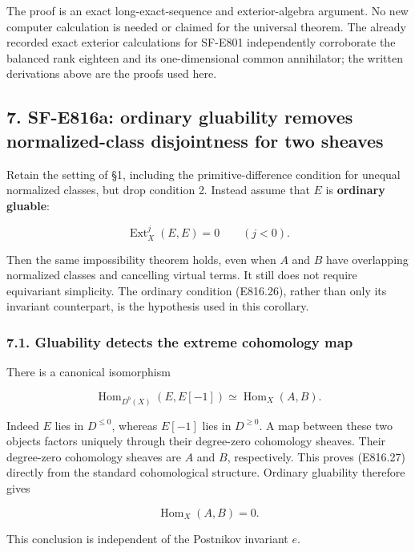 The proof is an exact long-exact-sequence and exterior-algebra argument.
No new computer calculation is needed or claimed for the universal
theorem. The already recorded exact exterior calculations for SF-E801
independently corroborate the balanced rank eighteen and its
one-dimensional common annihilator; the written derivations above are
the proofs used here.

\subsection{7. SF-E816a: ordinary gluability removes normalized-class
disjointness for two
sheaves}\label{SF-E816-sf-e816a-ordinary-gluability-removes-normalized-class-disjointness-for-two-sheaves}

Retain the setting of §1, including the primitive-difference condition
for unequal normalized classes, but drop condition 2. Instead assume
that \(E\) is \textbf{ordinary gluable}:

\[
 \operatorname{Ext}^j_X(E,E)=0\qquad(j<0).
 \tag{E816.26}
\]

Then the same impossibility theorem holds, even when \(A\) and \(B\)
have overlapping normalized classes and cancelling virtual terms. It
still does not require equivariant simplicity. The ordinary condition
(E816.26), rather than only its invariant counterpart, is the hypothesis
used in this corollary.

\subsubsection{7.1. Gluability detects the extreme cohomology
map}\label{SF-E816-gluability-detects-the-extreme-cohomology-map}

There is a canonical isomorphism

\[
 \operatorname{Hom}_{D^b(X)}(E,E[-1])
       \simeq\operatorname{Hom}_X(A,B).
 \tag{E816.27}
\]

Indeed \(E\) lies in \(D^{\le0}\), whereas \(E[-1]\) lies in
\(D^{\ge0}\). A map between these two objects factors uniquely through
their degree-zero cohomology sheaves. Their degree-zero cohomology
sheaves are \(A\) and \(B\), respectively. This proves (E816.27)
directly from the standard cohomological structure. Ordinary gluability
therefore gives

\[
 \operatorname{Hom}_X(A,B)=0.
 \tag{E816.28}
\]

This conclusion is independent of the Postnikov invariant \(e\).

